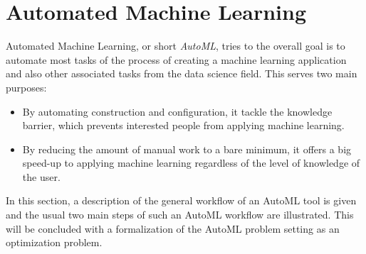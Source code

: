 \section{Automated Machine Learning}
\label{sec:theory:automl}
Automated Machine Learning, or short \textit{AutoML}, tries to the overall goal is to automate most tasks of the process of creating a machine learning application and also other associated tasks from the data science field.
This serves two main purposes:
\begin{itemize}
    \item By automating construction and configuration, it tackle the knowledge barrier, which prevents interested people from applying machine learning.
    \item By reducing the amount of manual work to a bare minimum, it offers a big speed-up to applying machine learning regardless of the level of knowledge of the user.
\end{itemize}
In this section, a description of the general workflow of an AutoML tool is given and the usual two main steps of such an AutoML workflow are illustrated.
This will be concluded with a formalization of the AutoML problem setting as an optimization problem.

